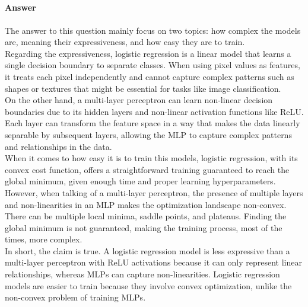 \documentclass{article}
\begin{document}
\subsection{}

\subsubsection{}

\paragraph{Answer}
The answer to this question mainly focus on two topics: how complex the models are, meaning their expressiveness, and how easy they are to train. \\
Regarding the expressiveness, logistic regression is a linear model that learns a single decision boundary to separate classes. 
When using pixel values as features, it treats each pixel independently and cannot capture complex patterns such as shapes or textures 
that might be essential for tasks like image classification.\\ 
On the other hand, a multi-layer perceptron can learn non-linear decision boundaries due to its hidden layers and non-linear activation functions like ReLU. 
Each layer can transform the feature space in a way that makes the data linearly separable by subsequent layers, allowing the MLP to capture 
complex patterns and relationships in the data.\\
When it comes to how easy it is to train this models, logistic regression, with its convex cost function, offers a straightforward training guaranteed 
to reach the global minimum, given enough time and proper learning hyperparameters. 
However, when talking of a multi-layer perceptron, the presence of multiple layers and non-linearities in an MLP makes the optimization landscape non-convex. 
There can be multiple local minima, saddle points, and plateaus. Finding the global minimum is not guaranteed, making the training process, 
most of the times, more complex.\\
In short, the claim is true. A logistic regression model is less expressive than a multi-layer perceptron with ReLU activations because it can only 
represent linear relationships, whereas MLPs can capture non-linearities. Logistic regression models are easier to train because they involve 
convex optimization, unlike the non-convex problem of training MLPs.

\subsubsection{}
\label{1.2.b}
\end{document}
